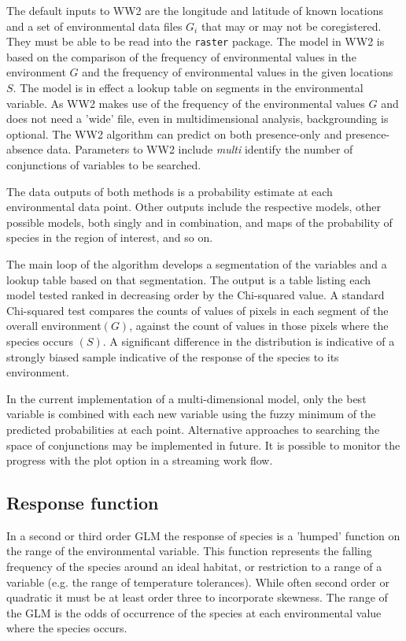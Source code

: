 \documentclass[10pt]{article}
\begin{document}
The default inputs to WW2 are the longitude and latitude of known locations and a set of environmental data files $G_i$ that may or may not be coregistered.  They must be able to be read into the \texttt{raster} package.  The model in WW2 is based on the comparison of the frequency of environmental values in the environment $G$ and the frequency of environmental values in the given locations $S$.  The model is in effect a lookup table on segments in the environmental variable.  As WW2 makes use of the frequency of the environmental values $G$ and does not need a 'wide' file, even in multidimensional analysis, backgrounding is optional.  The WW2 algorithm can predict on both presence-only and presence-absence data.  Parameters to WW2 include \emph{multi} identify the number of conjunctions of variables to be searched.  

The data outputs of both methods is a probability estimate at each environmental data point. Other outputs include the respective models, other possible models, both singly and in combination, and maps of the probability of species in the region of interest, and so on.

The main loop of the algorithm develops a segmentation of the variables and a lookup table based on that segmentation.  The output is a table listing each model tested ranked in decreasing order by the Chi-squared value.  A standard Chi-squared test compares the counts of values of pixels in each segment of the overall environment$(G)$, against the count of values in those pixels where the species occurs $(S)$.  A significant difference in the distribution is indicative of a strongly biased sample indicative of the response of the species to its environment. 

In the current implementation of a multi-dimensional model, only the best variable is combined with each new variable using the fuzzy minimum of the predicted probabilities at each point. Alternative approaches to searching the space of conjunctions may be implemented in future.  It is possible to monitor the progress with the plot option in a streaming work flow.

\subsection{Response function}

In a second or third order GLM the response of species is a 'humped' function on the range of the environmental variable.  This function represents the falling frequency of the species around an ideal habitat, or restriction to a range of a variable (e.g. the range of temperature tolerances).  While often second order or quadratic it must be at least order three to incorporate skewness. The range of the GLM is the odds of occurrence of the species at each environmental value where the species occurs.
\end{document}
